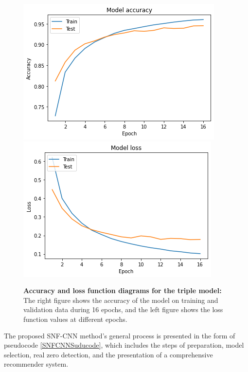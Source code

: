 \documentclass{bmcart}
\begin{document}
\begin{figure}[!h]
	\begin{minipage}{1\linewidth}
		\includegraphics[width=.48\textwidth]{lastTripleModel/modelTripleACC.png}
		\includegraphics[width=.48\textwidth]{lastTripleModel/modelTripleLoss.png}
	\end{minipage}
	\caption{\textbf{Accuracy and loss function diagrams for the triple model:} The right figure shows the accuracy of the model on training and validation data during 16 epochs, and the left figure shows the loss function values at different epochs.}
	\label{lastTripleModel}
\end{figure}



The proposed SNF-CNN method's general process is presented in the form of pseudocode \ref{SNFCNNSuducode}, which includes the steps of preparation, model selection, real zero detection, and the presentation of a comprehensive recommender system.
\end{document}
